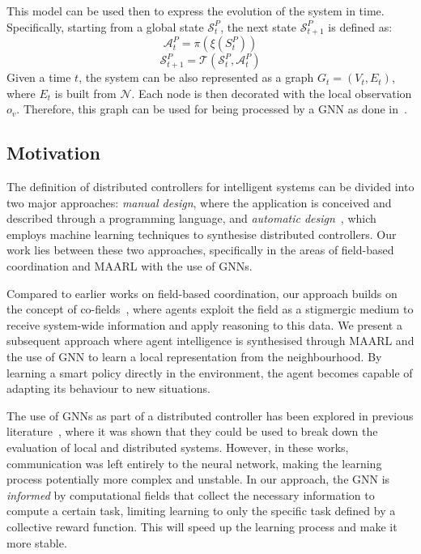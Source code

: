 \documentclass[conference]{IEEEtran}
\begin{document}
This model can be used then to express the evolution of the system in time.
Specifically, starting from a global state $\mathcal{S}^P_t$, the next state $\mathcal{S}^P_{t+1}$ is defined as:
\begin{equation}
\mathcal{A}^P_t = \pi(\xi(S^P_t))
\end{equation}
\begin{equation}
\mathcal{S}^P_{t+1} = \mathcal{T}(\mathcal{S}^P_t, \mathcal{A}^P_t)
\end{equation}
Given a time $t$, the system can be also represented as a graph $G_t = (V_t, E_t)$, 
  where $E_t$ is built from $\mathcal{N}$.
  Each node is then decorated with the local observation $o_v$. 
  Therefore, this graph can be used for being processed by a \ac{GNN} as done in~\cite{DBLP:conf/corl/TolstayaGPP0R19,tolstaya2020learning,DBLP:conf/icra/GosrichMLPYR022}.
\subsection{Motivation}
The definition of distributed controllers for intelligent systems can be divided into two major approaches: 
 \emph{manual design}, where the application is conceived and described through a programming language, 
 and \emph{automatic design}~\cite{brambilla2013swarm}, which employs machine learning techniques to synthesise distributed controllers. 
%
Our work lies between these two approaches, specifically in the areas of field-based coordination and \ac{MAARL} with the use of \acp{GNN}.

Compared to earlier works on field-based coordination, 
 our approach builds on the concept of co-fields~\cite{DBLP:journals/pervasive/MameiZL04}, 
 where agents exploit the field as a stigmergic medium to receive system-wide information and apply reasoning to this data.
%  
We present a subsequent approach where agent intelligence is synthesised through \ac{MAARL} and the use of \ac{GNN} to learn a local representation from the neighbourhood.
%
By learning a smart policy directly in the environment, the agent becomes capable of adapting its behaviour to new situations.

The use of \acp{GNN} as part of a distributed controller has been explored in previous literature~\cite{DBLP:conf/icra/GosrichMLPYR022,DBLP:conf/corl/TolstayaGPP0R19}, 
 where it was shown that they could be used to break down the evaluation of local and distributed systems. 
%
However, in these works, communication was left entirely to the neural network, 
 making the learning process potentially more complex and unstable. 
 In our approach, the \ac{GNN} is \emph{informed} by computational fields that collect the necessary information to compute a certain task, 
 limiting learning to only the specific task defined by a collective reward function.
 This will speed up the learning process and make it more stable.
\end{document}
